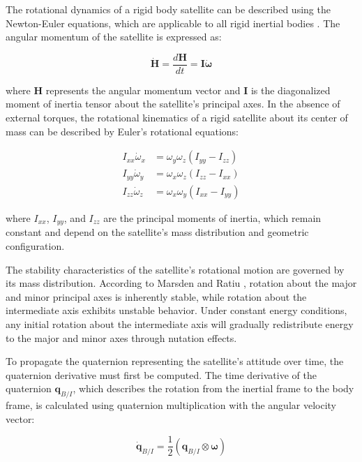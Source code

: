 
The rotational dynamics of a rigid body satellite can be described using the Newton-Euler equations, 
which are applicable to all rigid inertial bodies . The angular momentum of the satellite is expressed as:

\begin{equation}
\dot{\mathbf{H}} = \frac{d\mathbf{H}}{dt} = \mathbf{I}\dot{\boldsymbol{\omega}}
\end{equation}

\noindent where $\mathbf{H}$ represents the angular momentum vector and $\mathbf{I}$ is the diagonalized moment of 
inertia tensor about the satellite's principal axes. In the absence of external torques, the rotational kinematics 
of a rigid satellite about its center of mass can be described by Euler's rotational equations:

\begin{align}
I_{xx}\dot{\omega}_x &= \omega_y\omega_z(I_{yy} - I_{zz}) \\
I_{yy}\dot{\omega}_y &= \omega_x\omega_z(I_{zz} - I_{xx}) \\
I_{zz}\dot{\omega}_z &= \omega_x\omega_y(I_{xx} - I_{yy})
\end{align}

\noindent where $I_{xx}$, $I_{yy}$, and $I_{zz}$ are the principal moments of inertia, which remain constant and 
depend on the satellite's mass distribution and geometric configuration. 

The stability characteristics of the satellite's rotational 
motion are governed by its mass distribution. According to Marsden and Ratiu , rotation about the major and minor principal 
axes is inherently stable, while rotation about the intermediate axis exhibits unstable behavior. Under constant energy conditions, any 
initial rotation about the intermediate axis will gradually redistribute energy to the major and minor axes through nutation effects.

To propagate the quaternion representing the satellite's attitude over time, the quaternion derivative must first be computed.
 The time derivative of the quaternion $\mathbf{q}_{B/I}$, which describes the rotation from the inertial frame to the body frame,
is calculated using quaternion multiplication with the angular velocity vector:

\begin{equation}
\dot{\mathbf{q}}_{B/I} = \frac{1}{2}(\mathbf{q}_{B/I} \otimes \boldsymbol{\omega})
\end{equation}

